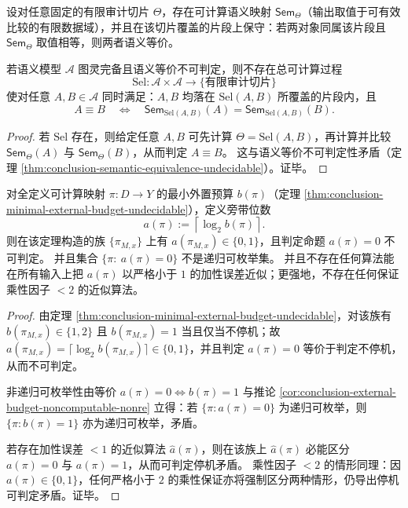 \begin{theorem}\label{thm:pom-no-computable-sufficient-slice-selector}
设对任意固定的有限审计切片 \(\Theta\)，存在可计算语义映射 \(\mathsf{Sem}_\Theta\)（输出取值于可有效比较的有限数据域），并且在该切片覆盖的片段上保守：若两对象同属该片段且 \(\mathsf{Sem}_\Theta\) 取值相等，则两者语义等价。
\par
若语义模型 \(\mathcal A\) 图灵完备且语义等价不可判定，则不存在总可计算过程
\[
\mathrm{Sel}:\mathcal A\times\mathcal A\to \{\text{有限审计切片}\}
\]
使对任意 \(A,B\in\mathcal A\) 同时满足：\(A,B\) 均落在 \(\mathrm{Sel}(A,B)\) 所覆盖的片段内，且
\[
A\equiv B\quad\Longleftrightarrow\quad
\mathsf{Sem}_{\mathrm{Sel}(A,B)}(A)=\mathsf{Sem}_{\mathrm{Sel}(A,B)}(B).
\]
\end{theorem}
\begin{proof}
若 \(\mathrm{Sel}\) 存在，则给定任意 \(A,B\) 可先计算 \(\Theta=\mathrm{Sel}(A,B)\)，再计算并比较 \(\mathsf{Sem}_\Theta(A)\) 与 \(\mathsf{Sem}_\Theta(B)\)，从而判定 \(A\equiv B\)。
这与语义等价不可判定性矛盾（定理 \ref{thm:conclusion-semantic-equivalence-undecidable}）。证毕。
\end{proof}

\begin{corollary}[可逆提升所需旁带位数的停机不可判定性与不可近似性]\label{cor:pom-ancilla-halting-inapproximability}
对全定义可计算映射 \(\pi:D\to Y\) 的最小外置预算 \(b(\pi)\)（定理 \ref{thm:conclusion-minimal-external-budget-undecidable}），定义旁带位数
\[
a(\pi):=\left\lceil \log_2 b(\pi)\right\rceil.
\]
则在该定理构造的族 \(\{\pi_{M,x}\}\) 上有 \(a(\pi_{M,x})\in\{0,1\}\)，且判定命题 \(a(\pi)=0\) 不可判定。
并且集合 \(\{\pi:\ a(\pi)=0\}\) 不是递归可枚举集。
并且不存在任何算法能在所有输入上把 \(a(\pi)\) 以严格小于 \(1\) 的加性误差近似；更强地，不存在任何保证乘性因子 \(<2\) 的近似算法。
\end{corollary}

\begin{proof}
由定理 \ref{thm:conclusion-minimal-external-budget-undecidable}，对该族有 \(b(\pi_{M,x})\in\{1,2\}\) 且 \(b(\pi_{M,x})=1\) 当且仅当不停机；故 \(a(\pi_{M,x})=\lceil\log_2 b(\pi_{M,x})\rceil\in\{0,1\}\)，并且判定 \(a(\pi)=0\) 等价于判定不停机，从而不可判定。
\par
非递归可枚举性由等价 \(a(\pi)=0\iff b(\pi)=1\) 与推论 \ref{cor:conclusion-external-budget-noncomputable-nonre} 立得：若 \(\{\pi:a(\pi)=0\}\) 为递归可枚举，则 \(\{\pi:b(\pi)=1\}\) 亦为递归可枚举，矛盾。
\par
若存在加性误差 \(<1\) 的近似算法 \(\widehat a(\pi)\)，则在该族上 \(\widehat a(\pi)\) 必能区分 \(a(\pi)=0\) 与 \(a(\pi)=1\)，从而可判定停机矛盾。
乘性因子 \(<2\) 的情形同理：因 \(a(\pi)\in\{0,1\}\)，任何严格小于 \(2\) 的乘性保证亦将强制区分两种情形，仍导出停机可判定矛盾。证毕。
\end{proof}

